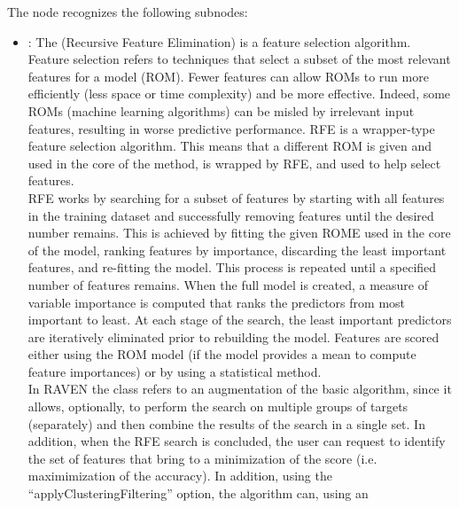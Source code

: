 \begin{itemize}
      The  node recognizes the following subnodes:
      \begin{itemize}
        \item {}:
          The  (Recursive Feature Elimination) is a feature selection algorithm.
          Feature selection refers to techniques that select a subset of the most relevant features
          for a model (ROM).         Fewer features can allow ROMs to run more efficiently (less
          space or time complexity) and be more effective.         Indeed, some ROMs (machine
          learning algorithms) can be misled by irrelevant input features, resulting in worse
          predictive performance.         RFE is a wrapper-type feature selection algorithm. This
          means that a different ROM is given and used in the core of the         method,         is
          wrapped by RFE, and used to help select features.         \\RFE works by searching for a
          subset of features by starting with all features in the training dataset and successfully
          removing         features until the desired number remains.         This is achieved by
          fitting the given ROME used in the core of the model, ranking features by importance,
          discarding the least important features, and re-fitting the model. This process is
          repeated until a specified number of         features remains.         When the full model
          is created, a measure of variable importance is computed that ranks the predictors from
          most         important to least.         At each stage of the search, the least important
          predictors are iteratively eliminated prior to rebuilding the model.         Features are
          scored either using the ROM model (if the model provides a mean to compute feature
          importances) or by         using a statistical method.         \\In RAVEN the
           class refers to an augmentation of the basic algorithm, since it allows,
          optionally,         to perform the search on multiple groups of targets (separately) and
          then combine the results of the search in a         single set. In addition, when the RFE
          search is concluded, the user can request to identify the set of features         that
          bring to a minimization of the score (i.e. maximimization of the accuracy).         In
          addition, using the ``applyClusteringFiltering'' option, the algorithm can, using an

\end{itemize}
\end{itemize}
